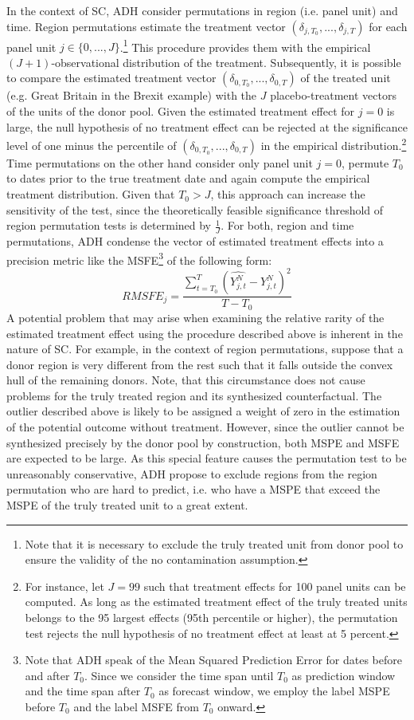 In the context of \ac{SC}, \ac{ADH} consider permutations in region (i.e. panel unit) and time. Region permutations estimate the treatment vector $(\delta_{j,T_0}, ..., \delta_{j,T})$ for each panel unit $j \in \{0, ..., J \}$.\footnote{Note that it is necessary to exclude the truly treated unit from donor pool to ensure the validity of the no contamination assumption.} This procedure provides them with the empirical $(J+1)$-observational distribution of the treatment. Subsequently, it is possible to compare the estimated treatment vector $(\delta_{0,T_0}, ..., \delta_{0,T})$ of the treated unit (e.g. Great Britain in the Brexit example) with the $J$ placebo-treatment vectors of the units of the donor pool. Given the estimated treatment effect for $j=0$ is large, the null hypothesis of no treatment effect can be rejected at the significance level of one minus the percentile of $(\delta_{0,T_0}, ..., \delta_{0,T})$ in the empirical distribution.\footnote{For instance, let $J = 99$ such that treatment effects for 100 panel units can be computed. As long as the estimated treatment effect of the truly treated units belongs to the 95 largest effects (95th percentile or higher), the permutation test rejects the null hypothesis of no treatment effect at least at 5 percent.} Time permutations on the other hand consider only panel unit $j = 0$, permute $T_0$ to dates prior to the true treatment date and again compute the empirical treatment distribution. Given that $T_0 > J$, this approach can increase the sensitivity of the test, since the theoretically feasible significance threshold of region permutation tests is determined by $\frac{1}{J}$. For both, region and time permutations, \ac{ADH} condense the vector of estimated treatment effects into a precision metric like the \ac{MSFE}\footnote{Note that \ac{ADH} speak of the Mean Squared Prediction Error for dates before and after $T_0$. Since we consider the time span until $T_0$ as prediction window and the time span after $T_0$ as forecast window, we employ the label \ac{MSPE} before $T_0$ and the label \ac{MSFE} from $T_0$ onward.} of the following form:
\[
RMSFE_j = \frac{\sum_{t = T_0}^{T} \left(\widehat{Y_{j,t}^N} - Y_{j,t}^N\right) ^2}{T- T_0}
\]
A potential problem that may arise when examining the relative rarity of the estimated treatment effect using the procedure described above is inherent in the nature of \ac{SC}. For example, in the context of region permutations, suppose that a donor region is very different from the rest such that it falls outside the convex hull of the remaining donors. Note, that this circumstance does not cause problems for the truly treated region and its synthesized counterfactual. The outlier described above is likely to be assigned a weight of zero in the estimation of the potential outcome without treatment. However, since the outlier cannot be synthesized precisely by the donor pool by construction, both \ac{MSPE} and \ac{MSFE} are expected to be large. As this special feature causes the permutation test to be unreasonably conservative, \ac{ADH} propose to exclude regions from the region permutation who are hard to predict, i.e. who have a \ac{MSPE} that exceed the \ac{MSPE} of the truly treated unit to a great extent. 

